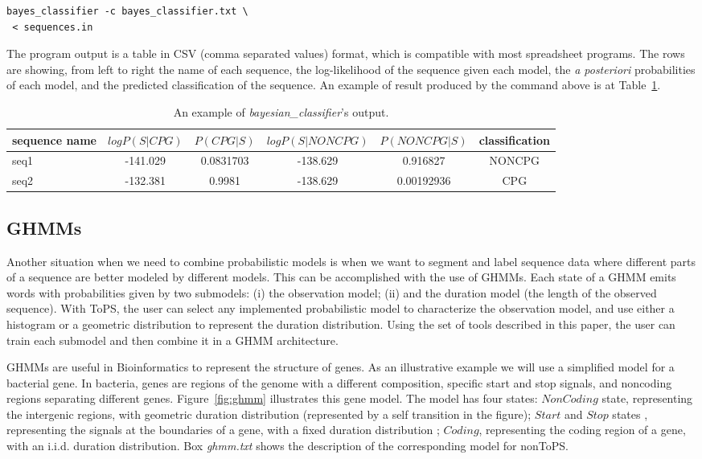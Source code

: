 \documentclass[10pt]{article}
\begin{document}
\begin{Verbatim}[frame=single, label={Command line}]
bayes_classifier -c bayes_classifier.txt \
 < sequences.in
\end{Verbatim}

The program output is a table in CSV (comma separated values) format, which is compatible with most spreadsheet programs. The rows are showing, from left to right the name of each sequence, the log-likelihood of the sequence given each model, the \textit{a posteriori} probabilities of each model, and the predicted classification of the sequence. An example of result produced by the command above is at Table~\ref{tab:bayes}.

\begin{table}
  \begin{tabular*}{\textwidth}[t!]{@{\extracolsep{\fill}}lccccc}\toprule
   sequence name & $log P(S|CPG)$ & $P(CPG|S)$ &  $log P(S|NONCPG)$ & $P(NONCPG|S)$ & classification \\ \hline
   seq1&-141.029&0.0831703&-138.629&0.916827&NONCPG \\
   seq2&-132.381&0.9981&-138.629&0.00192936&CPG \\ \bottomrule
 \end{tabular*}
 \caption{An example of \textit{ bayesian\_classifier}'s output.}
 \label{tab:bayes}
\end{table}


\subsection*{GHMMs}
\label{sec:ghmm}

Another situation when we need to combine probabilistic models is when we want to segment and label sequence data where different parts of a sequence are better modeled by different  models.  This can be accomplished with the use of  GHMMs. Each state of a GHMM emits words with probabilities  given by two submodels: (i) the observation model; (ii) and  the duration model (the length of the observed sequence). With ToPS, the user can select any implemented probabilistic model to characterize the observation model, and use either a histogram or a geometric distribution to represent the duration distribution. Using the  set of tools described in this paper, the user can  train each submodel and then combine it in a GHMM architecture.

GHMMs are useful in Bioinformatics to represent the structure of genes. As an illustrative  example we will use a simplified  model for a bacterial gene. In bacteria, genes are regions of the genome with a different composition, specific start and stop signals, and  noncoding regions separating different genes.  Figure~\ref{fig:ghmm} illustrates this gene model. The model has four states:   $NonCoding$ state, representing the intergenic regions, with geometric duration distribution (represented by a self transition in the figure); $Start$ and $Stop$ states , representing  the signals at the boundaries of a gene, with a fixed duration distribution ; $Coding$,  representing the coding region of a gene, with  an i.i.d.  duration distribution.  Box  \textit{ghmm.txt} shows the description of the corresponding model for nonToPS.
\end{document}

